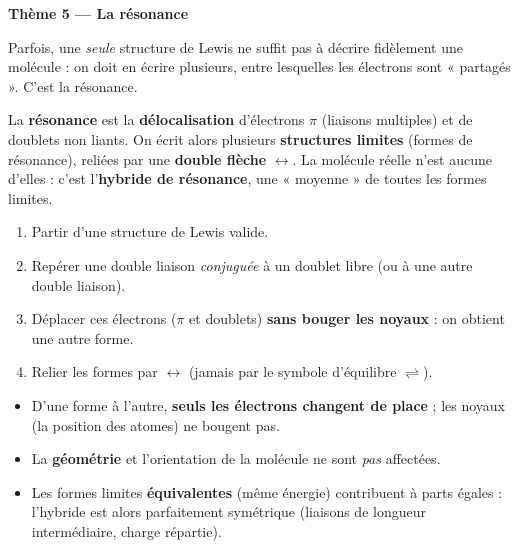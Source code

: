 \documentclass[11pt,a4paper]{article}
\begin{document}
\begin{center}
{\Large\bfseries\color{primarydark} Thème 5 — La résonance}
\end{center}

\smallskip
Parfois, une \emph{seule} structure de Lewis ne suffit pas à décrire fidèlement une molécule : on
doit en écrire plusieurs, entre lesquelles les électrons sont « partagés ». C'est la résonance.

\begin{cle}
La \textbf{résonance} est la \textbf{délocalisation} d'électrons $\pi$ (liaisons multiples) et de
doublets non liants. On écrit alors plusieurs \textbf{structures limites} (formes de résonance),
reliées par une \textbf{double flèche} $\leftrightarrow$. La molécule réelle n'est aucune d'elles :
c'est l'\textbf{hybride de résonance}, une « moyenne » de toutes les formes limites.
\end{cle}

\begin{methode}
\begin{enumerate}[leftmargin=1.9em,topsep=2pt,itemsep=1pt]
  \item Partir d'une structure de Lewis valide.
  \item Repérer une double liaison \emph{conjuguée} à un doublet libre (ou à une autre double liaison).
  \item Déplacer ces électrons ($\pi$ et doublets) \textbf{sans bouger les noyaux} : on obtient une
        autre forme.
  \item Relier les formes par $\leftrightarrow$ (jamais par le symbole d'équilibre $\rightleftharpoons$).
\end{enumerate}
\end{methode}

\begin{cle}
\begin{itemize}[leftmargin=1.5em,topsep=2pt,itemsep=1.5pt]
  \item D'une forme à l'autre, \textbf{seuls les électrons changent de place} ; les noyaux (la
        position des atomes) ne bougent pas.
  \item La \textbf{géométrie} et l'orientation de la molécule ne sont \emph{pas} affectées.
  \item Les formes limites \textbf{équivalentes} (même énergie) contribuent à parts égales :
        l'hybride est alors parfaitement symétrique (liaisons de longueur intermédiaire, charge
        répartie).
\end{itemize}
\end{cle}
\end{document}
